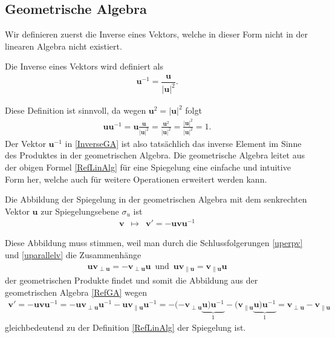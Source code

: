 \subsection{Geometrische Algebra}
Wir definieren zuerst die Inverse eines Vektors, welche in dieser Form nicht in der linearen Algebra nicht existiert.
\begin{definition}
	Die Inverse eines Vektors wird definiert als
	\begin{align} \label{InverseGA}
		\mathbf{u}^{-1} = \dfrac{\mathbf{u}}{|\mathbf{u}|^2}. 
	\end{align}
\end{definition}
Diese Definition ist sinnvoll, da wegen $\mathbf{u}^2 = |\mathbf{u}|^2$ folgt
\begin{align}
	\mathbf{uu}^{-1} = \mathbf{u} \frac{\mathbf{u}}{|\mathbf{u}|^2} = \frac{\mathbf{u}^2}{|\mathbf{u}|^2} = \frac{|\mathbf{u}|^2}{|\mathbf{u}|^2} = 1.
\end{align}
Der Vektor $\mathbf{u}^{-1}$ in \eqref{InverseGA} ist also tatsächlich das inverse Element im Sinne des Produktes in der geometrischen Algebra.
Die geometrische Algebra leitet aus der obigen Formel \eqref{RefLinAlg} für eine Spiegelung eine einfache und intuitive Form her, welche auch für weitere Operationen erweitert werden kann.
\begin{definition}
	Die Abbildung der Spiegelung in der geometrischen Algebra mit dem senkrechten Vektor $\mathbf{u}$ zur Spiegelungsebene $\sigma_u$ ist 
	\begin{align}\label{RefGA}
		\mathbf{v} \enspace\mapsto\enspace \mathbf{v}' = -\mathbf{uvu}^{-1}
	\end{align}
\end{definition}
Diese Abbildung muss stimmen, weil man durch die Schlussfolgerungen \eqref{uperpv} und \eqref{uparallelv} die Zusammenhänge
\begin{align}
	\mathbf{uv_{\perp u}} = -\mathbf{v_{\perp u}u} \enspace\text{und}\enspace \mathbf{uv_{\parallel u}}=\mathbf{v_{\parallel u}u}
\end{align}
der geometrischen Produkte findet und somit die Abbildung aus der geometrischen Algebra \eqref{RefGA} wegen
\begin{align}
	\mathbf{v}' = -\mathbf{uvu}^{-1} = -\mathbf{uv_{\perp u}u}^{-1} - \mathbf{uv_{\parallel u}u}^{-1} = -(-\mathbf{v_{\perp u}}\underbrace{\mathbf{u})\mathbf{u}^{-1}}_{1} -(\mathbf{v_{\parallel u}}\underbrace{\mathbf{u})\mathbf{u}^{-1}}_{1} = \mathbf{v_{\perp u}} - \mathbf{v_{\parallel u}}
\end{align}
gleichbedeutend zu der Definition \eqref{RefLinAlg} der Spiegelung ist.

